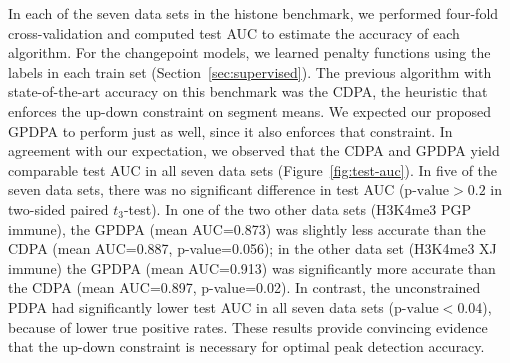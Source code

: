 \documentclass[twoside,11pt]{article}
\begin{document}
In each of the seven data sets in the histone benchmark,
we performed four-fold cross-validation and computed test AUC to estimate the
accuracy of each algorithm. For the changepoint models, we learned
penalty functions using the labels in each train set
(Section~\ref{sec:supervised}). The previous algorithm with
state-of-the-art accuracy on this benchmark was the CDPA, the heuristic that
enforces the up-down constraint on segment means. We expected our
proposed GPDPA to perform just as well, since it also enforces that
constraint. In agreement with our expectation, we observed that the
CDPA and GPDPA yield comparable test AUC in all seven data sets
(Figure~\ref{fig:test-auc}).
In five of the seven data sets,
there was no significant difference in test AUC ($\text{p-value}>0.2$ in
two-sided paired $t_3$-test). In one of the two other data sets
(H3K4me3 PGP immune), the GPDPA (mean AUC=0.873) was slightly less
accurate than the CDPA (mean AUC=0.887, p-value=0.056); in the other
data set (H3K4me3 XJ immune) the GPDPA (mean AUC=0.913) was significantly
more accurate than the CDPA (mean AUC=0.897, p-value=0.02). In contrast, the
unconstrained PDPA had significantly lower test AUC in all seven data sets
($\text{p-value}<0.04$), because of lower true positive rates. These results
provide convincing evidence that the up-down constraint is necessary for
optimal peak detection accuracy.
\end{document}
